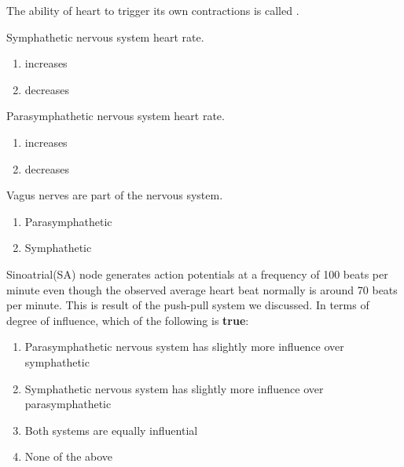 \documentclass[11pt,paper=a4,answers]{exam}
\begin{document}
\begin{questions}

\pointsinrightmargin
\pointsdroppedatright
\marksnotpoints
\pointformat{\boldmath\themarginpoints}
\bracketedpoints
\question[01]
The ability of heart to trigger its own contractions is called \underline{\hspace{3cm}}.
\label{Q:perunit}
\droppoints

\question[01]
\label{Q:perunit}
Symphathetic nervous system \underline{\hspace{3cm}} heart rate.
\droppoints
\begin{enumerate}[label=\alph*]
\item increases
\item decreases
\end{enumerate}


\question[01]
\label{Q:perunit}
Parasymphathetic nervous system \underline{\hspace{3cm}} heart rate.
\droppoints
\begin{enumerate}[label=\alph*]
\item increases
\item decreases
\end{enumerate}


\question[01]
\label{Q:perunit}
Vagus nerves are part of the \underline{\hspace{3cm}} nervous system.
\droppoints
\begin{enumerate}[label=\alph*]
\item Parasymphathetic
\item Symphathetic
\end{enumerate}


\question[01]
\label{Q:perunit}
Sinoatrial(SA) node generates action potentials at a frequency of 100 beats per minute even though the observed average heart beat normally is around 70 beats per minute. This is result of the push-pull system we discussed. In terms of degree of influence, which of the following is \textbf{true}:
\droppoints
\begin{enumerate}[label=\alph*]
\item Parasymphathetic nervous system has slightly more influence over symphathetic
\item Symphathetic nervous system has slightly more influence over parasymphathetic
\item Both systems are equally influential
\item None of the above
\end{enumerate}


\end{questions}
\end{document}
